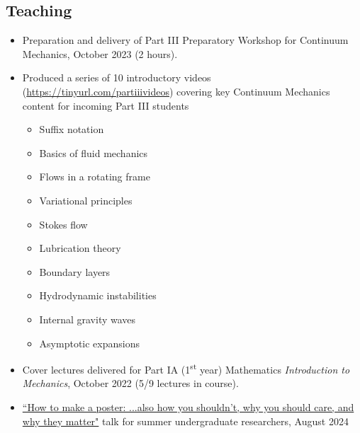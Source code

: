 \documentclass[a4paper]{article}
\begin{document}
    \begin{multicols}{2}
        \subsection*{Teaching}
            \begin{itemize}
                \item Preparation and delivery of Part III Preparatory Workshop for Continuum Mechanics, October 2023 (2 hours).\vspace{-0.5em}
                \item Produced a series of 10 introductory videos (\href{https://tinyurl.com/partiiivideos}{https://tinyurl.com/partiiivideos}) covering key Continuum Mechanics content for incoming Part III students
                    \begin{multicols}{2}
                        \begin{small}
                        \begin{itemize}
                            \item Suffix notation\vspace{-0.5em}
                            \item Basics of fluid mechanics\vspace{-0.5em}
                            \item Flows in a rotating frame\vspace{-0.5em}
                            \item Variational principles\vspace{-0.5em}
                            \item Stokes flow\vspace{-0.5em}
                            \item Lubrication theory\vspace{-0.5em}
                            \item Boundary layers\vspace{-0.5em}
                            \item Hydrodynamic instabilities\vspace{-0.5em}
                            \item Internal gravity waves\vspace{-0.5em}
                            \item Asymptotic expansions\vspace{-0.5em}
                        \end{itemize}
                        \end{small}
                    \end{multicols}
                \item Cover lectures delivered for Part IA (1\textsuperscript{st} year) Mathematics \textit{Introduction to Mechanics}, October 2022 (5/9 lectures in course).
                \item \href{https://jwebber.github.io/assets/talks/warwick_sumr_28082024.pdf}{``How to make a poster: ...also how you shouldn’t, why you should care, and why they matter"} talk for summer undergraduate researchers, August 2024
            \end{itemize}

\end{multicols}
\end{document}
